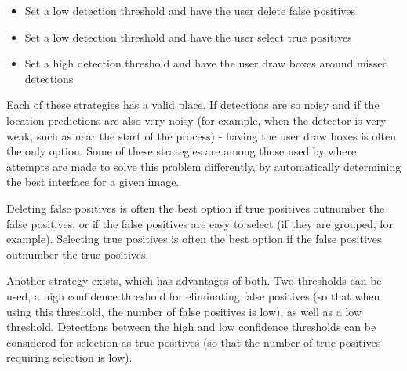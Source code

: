 \begin{itemize}
    \item Set a low detection threshold and have the user delete false positives
    \item Set a low detection threshold and have the user select true positives
    \item Set a high detection threshold and have the user draw boxes around missed detections
\end{itemize}

Each of these strategies has a valid place. If detections are so noisy and if the location predictions are also very noisy (for example, when the detector is very weak, such as near the start of the process) - having the user draw boxes is often the only option. Some of these strategies are among those used by \cite{Konyushkova2017} where attempts are made to solve this problem differently, by automatically determining the best interface for a given image.

Deleting false positives is often the best option if true positives outnumber the false positives, or if the false positives are easy to select (if they are grouped, for example). Selecting true positives is often the best option if the false positives outnumber the true positives. 

Another strategy exists, which has advantages of both. Two thresholds can be used, a high confidence threshold for eliminating false positives (so that when using this threshold, the number of false positives is low), as well as a low threshold. Detections between the high and low confidence thresholds can be considered for selection as true positives (so that the number of true positives requiring selection is low).




